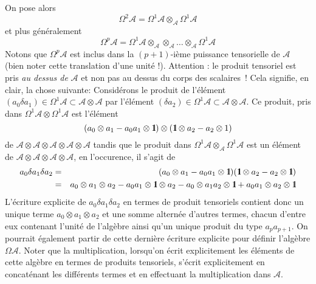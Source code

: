 	On pose alors
	$$ \Omega^{2}{\mathcal A}  = 
	 \Omega^{1}{\mathcal A} \otimes_{{\mathcal A}} \Omega^{1}{\mathcal A}$$
	 et plus g\'en\'eralement
	$$ \Omega^{p}{\mathcal A}  = 
	 \Omega^{1}{\mathcal A} \otimes_{{\mathcal A}} \otimes_{{\mathcal A}} \ldots 
	 \otimes_{{\mathcal A}} \Omega^{1}{\mathcal A}$$
	 Notons que $ \Omega^{p}{\mathcal A}$ est inclus dans la $(p+1)$-i\`eme puissance 
	 tensorielle de $\mathcal A$ (bien noter cette translation d'une unit\'e !).
	 Attention : le produit tensoriel est pris {\it au dessus de }${\mathcal A}$ et non pas au dessus du corps 
	 des scalaires~! Cela signifie, en clair, la chose suivante:
	 Consid\'erons le produit de l'\'el\'ement 
	 $(a_{0} \delta a_{1}) \in \Omega^{1}{\mathcal A} \subset {\mathcal 
	 A} \otimes {\mathcal A} $ par 
	 l'\'el\'ement $(\delta a_{2}) \in \Omega^{1}{\mathcal A} \subset {\mathcal 
	 A} \otimes {\mathcal A}$.  Ce produit, pris dans $\Omega^{1}{\mathcal A} 
	 \otimes \Omega^{1}{\mathcal A}$ est l'\'el\'ement 
	 $$
	 (a_{0}\otimes a_{1} - a_{0} a_{1} \otimes \mbox{\rm 1}\hskip-3pt \mbox{\rm l})\otimes
	 (\mbox{\rm 1}\hskip-3pt \mbox{\rm l}\otimes a_{2} - a_{2} \otimes 1)
	 $$
	 de  ${\mathcal A}\otimes {\mathcal A}\otimes {\mathcal A}\otimes{\mathcal A}\otimes{\mathcal A}$
	 tandis que le produit dans $\Omega^{1}{\mathcal A} \otimes_{{{\mathcal 
	 A}}} \Omega^{1}{\mathcal A}$ est un \'el\'ement de ${\mathcal A}\otimes 
	 {\mathcal A}\otimes {\mathcal A}\otimes{\mathcal A}$, en 
	 l'occurence, il s'agit de 
	 \begin{eqnarray*}
	 a_{0} \delta a_{1} \delta a_{2} & = & 
	 	 (a_{0}\otimes a_{1} - a_{0} a_{1} \otimes \mbox{\rm 1}\hskip-3pt \mbox{\rm l})
	 (\mbox{\rm 1}\hskip-3pt \mbox{\rm l}\otimes a_{2} - a_{2} \otimes \mbox{\rm 1}\hskip-3pt \mbox{\rm l}) \\
	  {} & = & a_{0} \otimes a_{1} \otimes a_{2} - a_{0}a_{1}\otimes \mbox{\rm 1}\hskip-3pt \mbox{\rm l} 
	  \otimes a_{2} - a_{0} \otimes a_{1} a_{2} \otimes \mbox{\rm 1}\hskip-3pt \mbox{\rm l} + a_{0} 
	  a_{1}\otimes a_{2} \otimes \mbox{\rm 1}\hskip-3pt \mbox{\rm l}
	 \end{eqnarray*}
      L'\'ecriture explicite de $ a_{0} \delta a_{1} \delta a_{2}$ en 
      termes de produit tensoriels contient donc un unique terme $a_{0} 
      \otimes a_{1} \otimes a_{2}$ et une somme altern\'ee d'autres 
      termes, chacun d'entre eux contenant l'unit\'e de l'alg\`ebre ainsi 
      qu'un unique produit du type  $a_{p}a_{p+1}$. On pourrait 
      \'egalement  partir de cette derni\`ere \'ecriture 
      explicite pour d\'efinir l'alg\`ebre $\Omega {\mathcal A}$. Noter 
      que la multiplication, lorsqu'on \'ecrit 
	  explicitement les \'el\'ements de cette alg\`ebre en termes de produits
	  tensoriels, s'\'ecrit explicitement en concat\'enant les diff\'erents 
	  termes et en effectuant la multiplication dans ${\mathcal A}$.
	 
